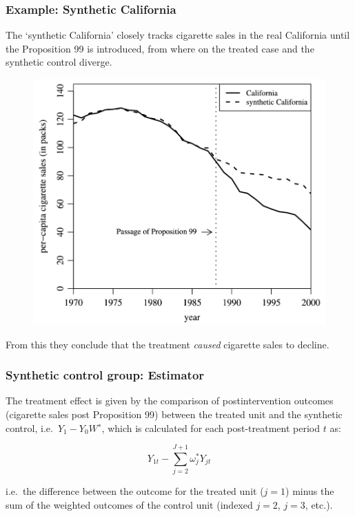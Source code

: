 \documentclass[12pt,english,dvipsnames,aspectratio=169,handout]{beamer}\usepackage[]{graphicx}\usepackage[]{xcolor}
\begin{document}
\begin{frame}
  \frametitle{Example: Synthetic California}
\footnotesize

The `synthetic California' closely tracks cigarette sales in the real California until the Proposition 99 is introduced, from where on the treated case and the synthetic control diverge.

	 \begin{figure} 
    \includegraphics[height=.5\textheight,keepaspectratio=true]{../04-figures/08/08-abadie2}
    \end{figure}

From this they conclude that the treatment \emph{caused} cigarette sales to decline. 
\end{frame}



\begin{frame}
  \frametitle{Synthetic control group: Estimator}
\footnotesize

The treatment effect is given by the comparison of postintervention outcomes (cigarette sales post Proposition 99) between the treated unit and the synthetic control, i.e.\ $Y_1 − Y_0W^∗$, which is calculated for each post-treatment period $t$ as:

\begin{equation*} 
Y_{1t}-\sum_{j=2}^{J+1} \omega^*_jY_{jt}
\end{equation*}

i.e.\ the difference between the outcome for the treated unit ($j=1$) minus the sum of the weighted outcomes of the control unit (indexed $j=2$, $j=3$, etc.).

\vspace{10mm}

\end{frame}
\end{document}
